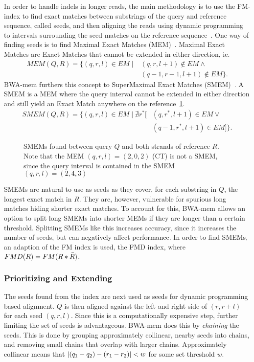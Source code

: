 In order to handle indels in longer reads, the main methodology is to use the FM-index to find exact matches between substrings of the query and reference sequence, called seeds, and then aligning the reads using dynamic programming to intervals surrounding the seed matches on the reference sequence~\cite{bowtie2}.
One way of finding seeds is to find Maximal Exact Matches (MEM)~\cite{longmem}.
Maximal Exact Matches are Exact Matches that cannot be extended in either direction, ie. 
\begin{align*}
  MEM(Q, R) = \{(q, r, l) \in EM \mid &(q, r, l+1) \notin EM \wedge \\
  & (q-1, r-1, l+1) \notin EM \}.
\end{align*}
BWA-mem furthers this concept to SuperMaximal Exact Matches (SMEM)~\cite{origsmem}.
A SMEM is a MEM where the query interval cannot be extended in either direction and still yield an Exact Match anywhere on the reference~\ref{fig:smem}.
\begin{align*}
  SMEM(Q, R) = \{(q, r, l) \in EM \mid \nexists r^*[&(q, r^*, l+1) \in EM \vee\\
    &(q-1, r^*, l+1) \in EM] \}.
\end{align*}
\begin{figure}
  \tikzpicture
  
  \endtikzpicture
  \caption{SMEMs found between query $Q$ and both strands of reference $R$. Note that the MEM $(q, r, l)=(2, 0, 2)$ (CT) is not a SMEM, since the query interval is contained in the SMEM $(q, r, l) = (2, 4, 3)$}
  \label{fig:smem}
\end{figure}

SMEMs are natural to use as seeds as they cover, for each substring in $Q$, the longest exact match in $R$.
They are, however, vulnerable for spurious long matches hiding shorter exact matches.
To account for this, BWA-mem allows an option to split long SMEMs into shorter MEMs if they are longer than a certain threshold.
Splitting SMEMs like this increases accuracy, since it increases the number of seeds, but can negatively affect performance. 
In order to find SMEMs, an adaption of the FM index is used, the FMD index, where $FMD(R) = FM(R * \bar{R})$.

\subsubsection{Prioritizing and Extending}
The seeds found from the index are next used as seeds for dynamic programming based alignment.
$Q$ is then aligned against the left and right side of $(r, r+l)$ for each seed $(q, r, l)$.
Since this is a computationally expensive step, further limiting the set of seeds is advantageous.
BWA-mem does this by \emph{chaining} the seeds.
This is done by grouping approximately collinear, nearby seeds into chains, and removing small chains that overlap with larger chains.
Approximately collinear means that $\left | (q_1-q_2) -(r_1-r_2) \right |<w$ for some set threshold $w$.

